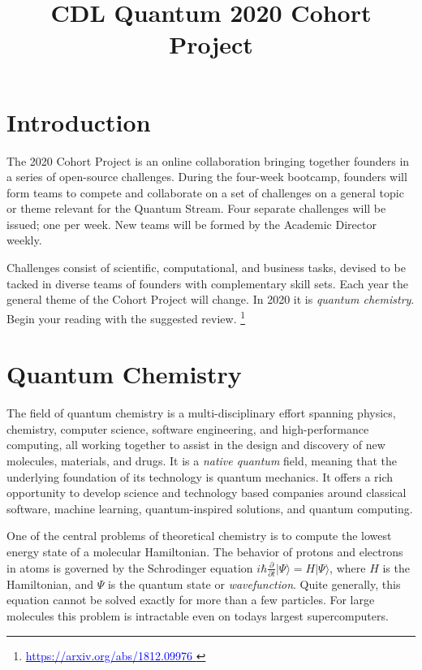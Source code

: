 \documentclass[12pt]{article}
\title{CDL Quantum 2020 Cohort Project}
\begin{document}
\maketitle

\thispagestyle{empty}
\section{Introduction}

The 2020 Cohort Project is an online collaboration bringing together founders in a series of open-source challenges.
During the four-week bootcamp, founders will form teams to compete and collaborate on a set of challenges on a general topic or theme
relevant for the Quantum Stream.  Four separate challenges will be issued; one per week.  New teams will be formed by the Academic Director weekly.

Challenges consist of scientific, computational, and business tasks, devised to be tacked in diverse teams of founders with complementary skill sets.  Each year
the general theme of the Cohort Project will change.  In 2020 it is {\it quantum chemistry}.  Begin your reading with the suggested review.
\footnote{\href{https://arxiv.org/abs/1812.09976}{\textcolor{blue}{https://arxiv.org/abs/1812.09976} }}


\section{Quantum Chemistry}

The field of quantum chemistry is a multi-disciplinary effort spanning physics, chemistry, computer science, software engineering, and high-performance computing,
all working together to assist in the design and discovery of new molecules, materials, and drugs.  It is a {\it native quantum} field, meaning that the underlying
foundation of its technology is quantum mechanics. It offers a rich opportunity to develop science and technology
based companies around classical software, machine learning, quantum-inspired solutions, and quantum computing.

One of the central problems of theoretical chemistry is to compute the lowest energy state of a molecular Hamiltonian.
The behavior of protons and electrons in atoms is governed by the Schrodinger equation
$i \hbar \frac{\partial }{ \partial t}  | \Psi \rangle = H | \Psi \rangle$, where $H$ is the Hamiltonian, and $\Psi$ is the quantum state or {\it wavefunction}.
Quite generally, this equation cannot be solved exactly for more than a few particles.
For large molecules this problem is intractable even on todays largest supercomputers.
\end{document}
